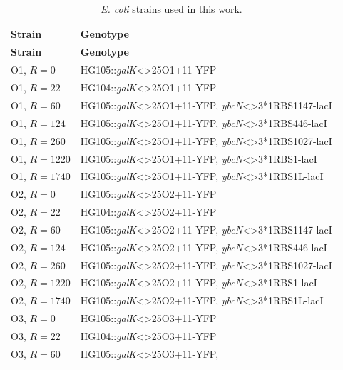 \documentclass[12pt]{caltech_thesis}
\begin{document}
\begin{longtable}[]{@{}ll@{}}
\caption{\emph{E. coli} strains used in this work.}\tabularnewline
\toprule()
\textbf{Strain} & \textbf{Genotype} \\
\midrule()
\endfirsthead
\toprule()
\textbf{Strain} & \textbf{Genotype} \\
\midrule()
\endhead
O1, \(R=0\) & HG105::\emph{galK}\textless\textgreater25O1+11-YFP \\
O1, \(R=22\) & HG104::\emph{galK}\textless\textgreater25O1+11-YFP \\
O1, \(R=60\) & HG105::\emph{galK}\textless\textgreater25O1+11-YFP,
\emph{ybcN}\textless\textgreater3*1RBS1147-lacI \\
O1, \(R=124\) & HG105::\emph{galK}\textless\textgreater25O1+11-YFP,
\emph{ybcN}\textless\textgreater3*1RBS446-lacI \\
O1, \(R=260\) & HG105::\emph{galK}\textless\textgreater25O1+11-YFP,
\emph{ybcN}\textless\textgreater3*1RBS1027-lacI \\
O1, \(R=1220\) & HG105::\emph{galK}\textless\textgreater25O1+11-YFP,
\emph{ybcN}\textless\textgreater3*1RBS1-lacI \\
O1, \(R=1740\) & HG105::\emph{galK}\textless\textgreater25O1+11-YFP,
\emph{ybcN}\textless\textgreater3*1RBS1L-lacI \\
O2, \(R=0\) & HG105::\emph{galK}\textless\textgreater25O2+11-YFP \\
O2, \(R=22\) & HG104::\emph{galK}\textless\textgreater25O2+11-YFP \\
O2, \(R=60\) & HG105::\emph{galK}\textless\textgreater25O2+11-YFP,
\emph{ybcN}\textless\textgreater3*1RBS1147-lacI \\
O2, \(R=124\) & HG105::\emph{galK}\textless\textgreater25O2+11-YFP,
\emph{ybcN}\textless\textgreater3*1RBS446-lacI \\
O2, \(R=260\) & HG105::\emph{galK}\textless\textgreater25O2+11-YFP,
\emph{ybcN}\textless\textgreater3*1RBS1027-lacI \\
O2, \(R=1220\) & HG105::\emph{galK}\textless\textgreater25O2+11-YFP,
\emph{ybcN}\textless\textgreater3*1RBS1-lacI \\
O2, \(R=1740\) & HG105::\emph{galK}\textless\textgreater25O2+11-YFP,
\emph{ybcN}\textless\textgreater3*1RBS1L-lacI \\
O3, \(R=0\) & HG105::\emph{galK}\textless\textgreater25O3+11-YFP \\
O3, \(R=22\) & HG104::\emph{galK}\textless\textgreater25O3+11-YFP \\
O3, \(R=60\) & HG105::\emph{galK}\textless\textgreater25O3+11-YFP,

\end{longtable}
\end{document}
